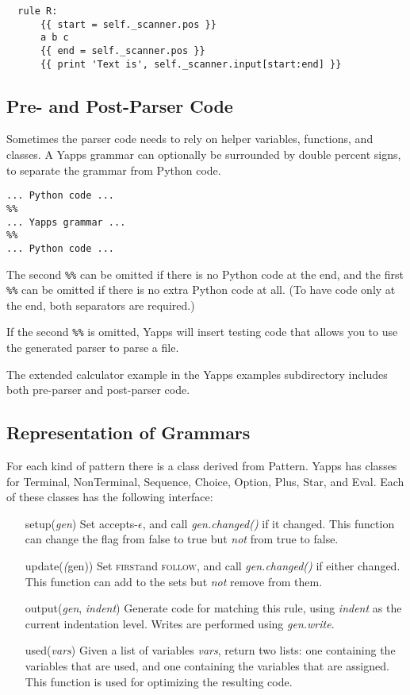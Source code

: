 \documentclass[10pt]{article}
\newcommand{\mysubsection}[1]{\subsection{#1}}
\newcommand{\first}{\textsc{first}}
\newcommand{\follow}{\textsc{follow}}
\begin{document}
\begin{verbatim}
  rule R: 
      {{ start = self._scanner.pos }}
      a b c 
      {{ end = self._scanner.pos }}
      {{ print 'Text is', self._scanner.input[start:end] }}
\end{verbatim}

\mysubsection{Pre- and Post-Parser Code}

Sometimes the parser code needs to rely on helper variables,
functions, and classes.  A Yapps grammar can optionally be surrounded
by double percent signs, to separate the grammar from Python code.

\begin{verbatim}
... Python code ...
%%
... Yapps grammar ...
%%
... Python code ...
\end{verbatim}

The second \verb|%%| can be omitted if there is no Python code at the
end, and the first \verb|%%| can be omitted if there is no extra
Python code at all.  (To have code only at the end, both separators
are required.)

If the second \verb|%%| is omitted, Yapps will insert testing code
that allows you to use the generated parser to parse a file.

The extended calculator example in the Yapps examples subdirectory
includes both pre-parser and post-parser code.

\mysubsection{Representation of Grammars}

For each kind of pattern there is a class derived from Pattern.  Yapps 
has classes for Terminal, NonTerminal, Sequence, Choice, Option, Plus, 
Star, and Eval.  Each of these classes has the following interface:

\begin{itemize}
 \item[setup(\emph{gen})] Set accepts-$\epsilon$, and call
   \emph{gen.changed()} if it changed.  This function can change the
   flag from false to true but \emph{not} from true to false.
 \item[update(\emph(gen))] Set \first and \follow, and call
   \emph{gen.changed()} if either changed.  This function can add to
   the sets but \emph{not} remove from them.
 \item[output(\emph{gen}, \emph{indent})] Generate code for matching
   this rule, using \emph{indent} as the current indentation level.
   Writes are performed using \emph{gen.write}.
 \item[used(\emph{vars})] Given a list of variables \emph{vars},
   return two lists: one containing the variables that are used, and
   one containing the variables that are assigned.  This function is
   used for optimizing the resulting code.
\end{itemize}
\end{document}
